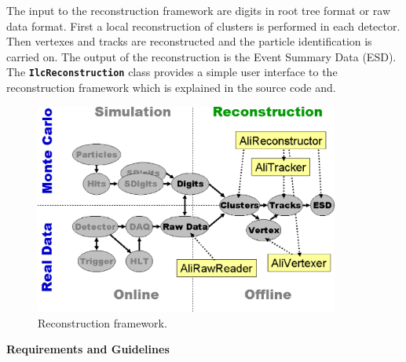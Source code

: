 \documentclass[12pt,a4paper,twoside]{article}
\newcommand{\class}[1]{\texttt{\textbf{#1}}\xspace}
\begin{document}
The input to the reconstruction framework are digits in root tree
format or raw data format. First a local reconstruction of clusters is
performed in each detector. Then vertexes and tracks are reconstructed
and the particle identification is carried on. The output of the reconstruction
is the Event Summary Data (ESD). The \class{IlcReconstruction} class provides
a simple user interface to the reconstruction framework which is
explained in the source code and. 

\begin{figure}[ht]
  \centering
  \includegraphics[width=10cm]{picts/ReconstructionFramework}
  \caption{Reconstruction framework.} \label{MC:Reconstruction}
\end{figure}

\textbf{Requirements and Guidelines}
\end{document}
